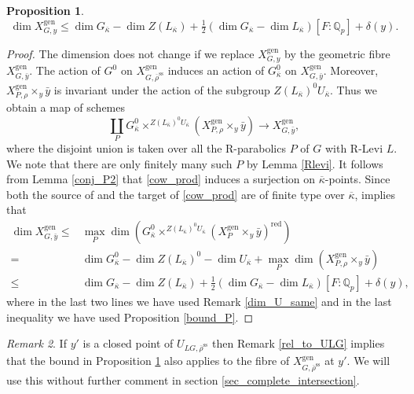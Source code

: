 \documentclass{amsart}
\newtheorem{prop}{Proposition}[section]
\theoremstyle{definition}
\theoremstyle{remark}
\newtheorem{remar}[prop]{Remark}
\newcommand{\Qp}{\mathbb {Q}_p}
\newcommand{\rhobar}{\overline{\rho}}
\newcommand{\gen}{\mathrm{gen}}
\newcommand{\red}{\mathrm{red}}
\newcommand{\kappabar}{\overline{\kappa}}
\newcommand{\rhobarss}{\rhobar^{\mathrm{ss}}}
\newcommand{\ybar}{\bar{y}}
\begin{document}
\begin{prop}\label{bound_dim_fibre}
$$\dim X^{\gen}_{G,y}\le \dim G_{\kappabar} -\dim Z(L_{\kappabar}) +\tfrac{1}{2}(\dim G_{\kappabar} - \dim L_{\kappabar})[F:\Qp] + \delta(y).$$
\end{prop}
\begin{proof} The dimension does not change if we replace $X^{\gen}_{G,y}$ by the 
geometric fibre $X^{\gen}_{G,\ybar}$. The action of $G^0$ on $X^{\gen}_{G, \rhobarss}$
induces an action of $G^0_{\kappabar}$ on $X^{\gen}_{G,\ybar}$. 
Moreover, $X^{\gen}_{P, \rho}\times_y \ybar$ is invariant under the action of 
the subgroup $Z(L_{\kappabar})^0 U_{\kappabar}$. Thus we obtain a map of schemes
\begin{equation}\label{cow_prod}
\coprod_{ P} G^0_{\kappabar} \times^{Z(L_{\kappabar})^0 U_{\kappabar}} (X^{\gen}_{P, \rho}\times_y \ybar)\rightarrow 
X^{\gen}_{G, \ybar},
\end{equation}
where the disjoint union is taken over all the R-parabolics $P$ of $G$ with 
R-Levi $L$. We note that there are
only finitely many such $P$ by Lemma \ref{Rlevi}. It follows from Lemma \ref{conj_P2} that \eqref{cow_prod}
induces a surjection on $\kappabar$-points. Since both the source of and the target of \eqref{cow_prod}
are of finite type over $\kappabar$, \cite[Lemma 3.14]{BIP_new} implies that 
\begin{displaymath}
\begin{split}
\dim X^{\gen}_{G, \ybar}\le &\max_{P} 
\dim (G_{\kappabar}^0 \times^{Z(L_{\kappabar})^0 U_{\kappabar}}(X^{\gen}_{P}\times_y \ybar)^{\red})\\
=& 
\dim G_{\kappabar}^0  - \dim Z(L_{\kappabar})^0 - \dim U_{\kappabar}+ \max_{P} \dim (X^{\gen}_{P, \rho}\times_y \ybar)\\
\le& 
\dim G_{\kappabar} - \dim Z(L_{\kappabar}) +\tfrac{1}{2}(\dim G_{\kappabar} - \dim L_{\kappabar}) [F:\Qp] + \delta(y),
\end{split}
\end{displaymath}
where in the last two lines we have used Remark \ref{dim_U_same} and in the last inequality we have used Proposition  \ref{bound_P}.
\end{proof}

\begin{remar} If $y'$ is a closed point of $U_{LG, \rhobarss}$ then Remark \ref{rel_to_ULG} implies that the bound in 
Proposition \ref{bound_dim_fibre} also applies to the fibre of $X^{\gen}_{G,\rhobarss}$ at $y'$. We will use this without further comment  in section \ref{sec_complete_intersection}. 
\end{remar}
\end{document}
